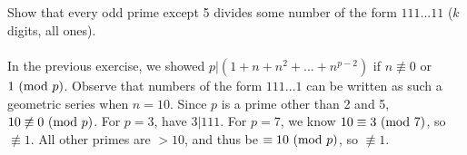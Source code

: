 \documentclass{article}
\begin{document}
\subsection{}
Show that every odd prime except 5 divides some number of the form $111...11$
($k$ digits, all ones).\\~\\
In the previous exercise, we showed $p|(1 + n + n^2 + ... + n^{p - 2})$
if $n \not\equiv 0$ or $1 \ (\mathrm{mod}\ p)$.
Observe that numbers of the form $111...1$ can be written as such a geometric
series when $n = 10$.
Since $p$ is a prime other than 2 and 5, $10 \not\equiv 0 \ (\mathrm{mod}\ p)$.
For $p = 3$, have $3|111$.
For $p = 7$, we know $10 \equiv 3 \ (\mathrm{mod}\ 7)$, so $\not\equiv 1$.
All other primes are $> 10$, and thus be $\equiv 10 \ (\mathrm{mod}\ p)$, so $\not\equiv 1$.
\end{document}
